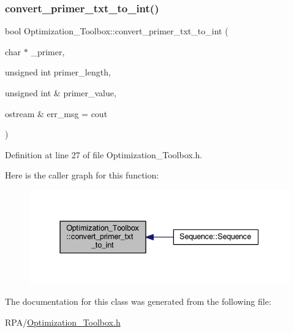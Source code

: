\subsubsection{\texorpdfstring{convert\+\_\+primer\+\_\+txt\+\_\+to\+\_\+int()}{convert\_primer\_txt\_to\_int()}}
{\footnotesize\ttfamily bool Optimization\+\_\+\+Toolbox\+::convert\+\_\+primer\+\_\+txt\+\_\+to\+\_\+int (\begin{DoxyParamCaption}\item[{char $\ast$}]{\+\_\+primer,  }\item[{unsigned int}]{primer\+\_\+length,  }\item[{unsigned int \&}]{primer\+\_\+value,  }\item[{ostream \&}]{err\+\_\+msg = {\ttfamily cout} }\end{DoxyParamCaption})\hspace{0.3cm}{\ttfamily [static]}}



Definition at line 27 of file Optimization\+\_\+\+Toolbox.\+h.

Here is the caller graph for this function\+:
\nopagebreak
\begin{figure}[H]
\begin{center}
\leavevmode
\includegraphics[width=337pt]{class_optimization___toolbox_a44f2c18904985dd9591efe0a63bfae9b_icgraph}
\end{center}
\end{figure}


The documentation for this class was generated from the following file\+:\begin{DoxyCompactItemize}
\item 
R\+P\+A/\mbox{\hyperlink{_optimization___toolbox_8h}{Optimization\+\_\+\+Toolbox.\+h}}\end{DoxyCompactItemize}
